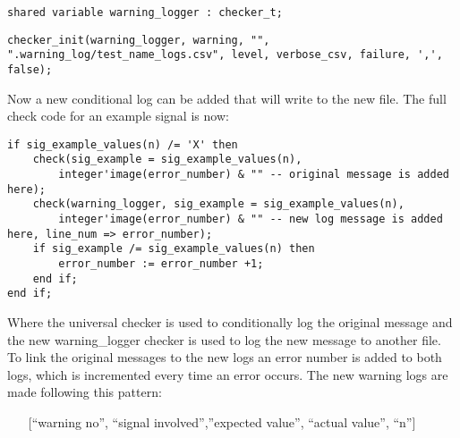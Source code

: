 \begin{lstlisting}[style=vhdl, caption={Custom checker declaration}, label={vhdl:new_checker_declaration}]
shared variable warning_logger : checker_t;
\end{lstlisting}\noindent
\begin{lstlisting}[style=vhdl, caption={Custom checker initialisation}, label={vhdl:new_checker_init}]
checker_init(warning_logger, warning, "", ".warning_log/test_name_logs.csv", level, verbose_csv, failure, ',', false);
\end{lstlisting}\noindent
Now a new conditional log can be added that will write to the new file. The full check code for an example signal is now:
\begin{lstlisting}[style=vhdl, caption={Improved signal checking}, label={vhdl:improved_check}]
if sig_example_values(n) /= 'X' then
	check(sig_example = sig_example_values(n), 
		integer'image(error_number) & "" -- original message is added here);
	check(warning_logger, sig_example = sig_example_values(n), 
		integer'image(error_number) & "" -- new log message is added here, line_num => error_number);
	if sig_example /= sig_example_values(n) then
		error_number := error_number +1;
	end if;
end if;
\end{lstlisting}\noindent
Where the universal checker is used to conditionally log the original message and the new warning\_logger checker is used to log the new message to another file. To link the original messages to the new logs an error number is added to both logs, which is incremented every time an error occurs.
\npar
The new warning logs are made following this pattern:
\begin{customenv}
	\begin{itemize}
		\item [] [“warning no”, “signal involved”,”expected value”, “actual value”, “n”] 
	\end{itemize}
\end{customenv}

